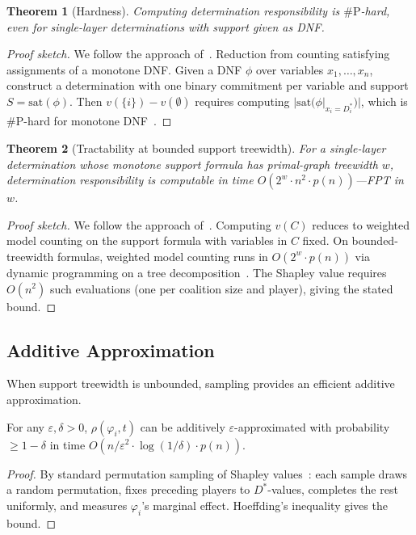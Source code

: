 \documentclass[acmsmall,review,anonymous]{acmart}
\newtheorem{theorem}{Theorem}
\theoremstyle{remark}
\numberwithin{definition}{section}
\numberwithin{theorem}{section}
\numberwithin{lemma}{section}
\numberwithin{corollary}{section}
\numberwithin{remark}{section}
\numberwithin{example}{section}
\numberwithin{observation}{section}
\numberwithin{assumption}{section}
\begin{document}
\begin{theorem}[Hardness]
  Computing determination responsibility is $\mathrm{\#P}$-hard, even
  for single-layer determinations with support given as DNF.
\end{theorem}
\begin{proof}[Proof sketch]
  We follow the approach of~\cite{livshits2021shapley}.
  Reduction from counting satisfying assignments of a monotone DNF.
  Given a DNF $\phi$ over variables $x_1,\ldots,x_n$, construct a
  determination with one binary commitment per variable and support
  $S = \mathrm{sat}(\phi)$.
  Then $v(\{i\}) - v(\emptyset)$ requires computing
  $|\mathrm{sat}(\phi|_{x_i = D^*_i})|$, which is $\mathrm{\#P}$-hard
  for monotone DNF~\cite{livshits2021shapley}.
\end{proof}

\begin{theorem}[Tractability at bounded support treewidth]
  \label{thm:responsibility-tw}
  For a single-layer determination whose monotone support formula has
  primal-graph treewidth $w$, determination responsibility is computable
  in time $O(2^w \cdot n^2 \cdot p(n))$---FPT in $w$.
\end{theorem}
\begin{proof}[Proof sketch]
  We follow the approach of~\cite{livshits2021shapley}.
  Computing $v(C)$ reduces to weighted model counting on the support
  formula with variables in $C$ fixed.
  On bounded-treewidth formulas, weighted model counting runs in
  $O(2^w \cdot p(n))$ via dynamic programming on a tree
  decomposition~\cite{livshits2021shapley}.
  The Shapley value requires $O(n^2)$ such evaluations (one per
  coalition size and player), giving the stated bound.
\end{proof}

\subsection{Additive Approximation}

When support treewidth is unbounded, sampling provides an efficient
additive approximation.

\begin{proposition}
  \label{prop:fpras}
  For any $\varepsilon, \delta > 0$, $\rho(\varphi_i, t)$ can be
  additively $\varepsilon$-approximated with probability
  $\ge 1 - \delta$ in time
  $O(n/\varepsilon^2 \cdot \log(1/\delta) \cdot p(n))$.
\end{proposition}
\begin{proof}
  By standard permutation sampling of Shapley
  values~\cite{livshits2021shapley,shapley1953value}: each sample draws
  a random permutation, fixes preceding players to $D^*$-values,
  completes the rest uniformly, and measures $\varphi_i$'s marginal
  effect.
  Hoeffding's inequality gives the bound.
\end{proof}
\end{document}
